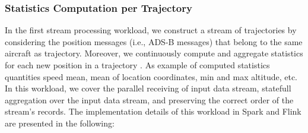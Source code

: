 \documentclass[]{article}
\begin{document}
\subsubsection{Statistics Computation per Trajectory}
In the first stream processing workload, we construct a stream of trajectories by considering  the position messages (i.e., ADS-B messages) that belong to the same aircraft as trajectory. Moreover, we continuously compute and aggregate statistics for each new position in a trajectory . As example of computed statistics quantities speed mean, mean of location coordinates, min and max altitude, etc. In this workload, we cover the parallel receiving of input data stream, statefull aggregation over the input data stream, and preserving the correct order of the stream's records.
The implementation details of this workload in Spark and Flink are presented in the following: 
\end{document}
